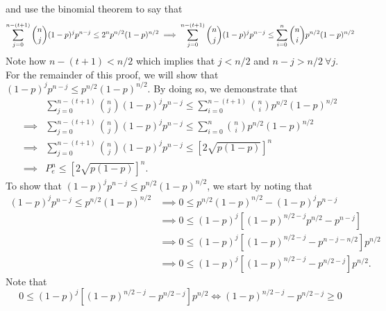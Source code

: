 \documentclass{article}
\begin{document}
\begin{enumerate}[(a)]
\begin{equation*}
					\end{equation*}
					and use the binomial theorem to say that
					\begin{equation*}
								 \sum_{j = 0}^{n - (t + 1)}{n \choose j}(1 - p)^jp^{n - j} \le 2^np^{n/2}(1 - p)^{n/2} \implies \sum_{j = 0}^{n - (t + 1)}{n \choose j}(1 - p)^jp^{n - j} \le \sum_{i = 0}^n{n \choose i}p^{n/2}(1 - p)^{n/2} \\
					\end{equation*}
					Note how $n - (t + 1) < n/2$ which implies that $j < n/2 $ and $n - j > n/2 \ \forall j$. For the remainder of this proof, we will show that $(1 - p)^jp^{n - j} \le p^{n/2}(1 - p)^{n/2}$. By doing so, we demonstrate that 
				\begin{equation*}\begin{aligned}
									& \sum_{j = 0}^{n - (t + 1)}{n \choose j}(1 - p)^jp^{n - j} \le \sum_{i = 0}^{n - (t + 1)}{n \choose i}p^{n/2}(1 - p)^{n/2} \\
         \implies &  \sum_{j = 0}^{n - (t + 1)}{n \choose j}(1 - p)^jp^{n - j} \le \sum_{i = 0}^{n}{n \choose i}p^{n/2}(1 - p)^{n/2} \\
				 \implies &  \sum_{j = 0}^{n - (t + 1)}{n \choose j}(1 - p)^jp^{n - j} \le \left [ 2 \sqrt{p(1 - p)} \right ]^n \\
				 \implies &  P_e^n \le \left [ 2 \sqrt{p(1 - p)} \right ]^n.
				\end{aligned}\end{equation*}
				To show that $(1 - p)^jp^{n - j} \le p^{n/2}(1 - p)^{n/2}$, we start by noting that
				\begin{equation*}\begin{aligned}
					(1 - p)^jp^{n - j} \le p^{n/2}(1 - p)^{n/2} & \implies 0 \le p^{n/2}(1 - p)^{n/2} - (1 - p)^jp^{n-j} \\
																										  & \implies 0 \le (1 - p)^j\left [ (1 - p)^{n/2 - j} p^{n/2} - p^{n - j}\right ] \\
																										  & \implies 0 \le (1 - p)^j\left [ (1 - p)^{n/2 - j} - p^{n - j - n/2} \right ]p^{n/2} \\
																										  & \implies 0 \le (1 - p)^j\left [ (1 - p)^{n/2 - j} - p^{n/2 - j} \right ]p^{n/2}. 
				\end{aligned}\end{equation*}
Note that 
				\begin{equation*}
						0 \le (1 - p)^j\left [ (1 - p)^{n/2 - j} - p^{n/2 - j} \right ]p^{n/2} \Longleftrightarrow (1 - p)^{n/2-j} - p^{n/2-j} \ge 0

\end{equation*}
\end{enumerate}
\end{document}
